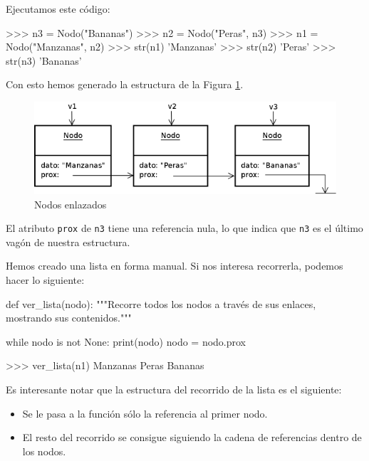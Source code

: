 Ejecutamos este código:

\begin{codigo-python-sn}
>>> n3 = Nodo("Bananas")
>>> n2 = Nodo("Peras", n3)
>>> n1 = Nodo("Manzanas", n2)
>>> str(n1)
'Manzanas'
>>> str(n2)
'Peras'
>>> str(n3)
'Bananas'
\end{codigo-python-sn}

Con esto hemos generado la estructura de la Figura \ref{nodos}.

\begin{figure}[htb]
\includegraphics{graficos/16_Nodos}
\caption{Nodos enlazados}
\label{nodos}
\end{figure}

El atributo \lstinline!prox! de \lstinline!n3! tiene una referencia nula,
lo que indica que \lstinline!n3! es el último vagón de nuestra estructura.

Hemos creado una lista en forma manual. Si nos interesa recorrerla, podemos
hacer lo siguiente:

\begin{codigo-python-sn}
def ver_lista(nodo):
    """Recorre todos los nodos a través de sus enlaces,
       mostrando sus contenidos."""

    while nodo is not None:
        print(nodo)
        nodo = nodo.prox
\end{codigo-python-sn}

\begin{codigo-python-sn}
>>> ver_lista(n1)
Manzanas
Peras
Bananas
\end{codigo-python-sn}

Es interesante notar que la estructura del recorrido de la lista es el
siguiente:

\begin{itemize}
\item Se le pasa a la función sólo la referencia al primer nodo.

\item El resto del recorrido se consigue siguiendo la cadena de
referencias dentro de los nodos.
\end{itemize}

